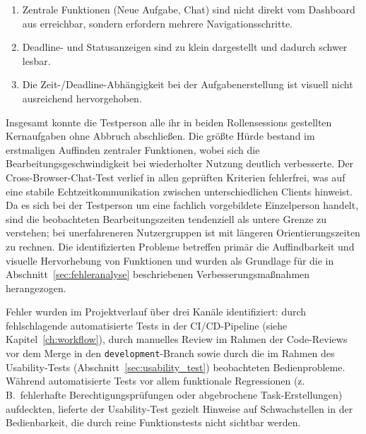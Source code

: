 \begin{enumerate}
    \item[\textbf{P1}] Zentrale Funktionen (\glqq{}Neue Aufgabe\grqq{}, Chat) sind nicht direkt vom Dashboard aus erreichbar, sondern erfordern mehrere Navigationsschritte.
    \item[\textbf{P2}] Deadline- und Statusanzeigen sind zu klein dargestellt und dadurch schwer lesbar.
    \item[\textbf{P3}] Die Zeit-/Deadline-Abhängigkeit bei der Aufgabenerstellung ist visuell nicht ausreichend hervorgehoben.
\end{enumerate}

Insgesamt konnte die Testperson alle ihr in beiden Rollensessions gestellten Kernaufgaben ohne Abbruch abschließen. Die größte Hürde bestand im erstmaligen Auffinden zentraler Funktionen, wobei sich die Bearbeitungsgeschwindigkeit bei wiederholter Nutzung deutlich verbesserte. Der Cross-Browser-Chat-Test verlief in allen geprüften Kriterien fehlerfrei, was auf eine stabile Echtzeitkommunikation zwischen unterschiedlichen Clients hinweist. Da es sich bei der Testperson um eine fachlich vorgebildete Einzelperson handelt, sind die beobachteten Bearbeitungszeiten tendenziell als untere Grenze zu verstehen; bei unerfahreneren Nutzergruppen ist mit längeren Orientierungszeiten zu rechnen. Die identifizierten Probleme betreffen primär die Auffindbarkeit und visuelle Hervorhebung von Funktionen und wurden als Grundlage für die in Abschnitt~\ref{sec:fehleranalyse} beschriebenen Verbesserungsmaßnahmen herangezogen.

\label{sec:fehleranalyse}

Fehler wurden im Projektverlauf über drei Kanäle identifiziert: durch fehlschlagende automatisierte Tests in der \gls{CI/CD}-Pipeline (siehe Kapitel~\ref{ch:workflow}), durch manuelles Review im Rahmen der Code-Reviews vor dem Merge in den \texttt{development}-Branch sowie durch die im Rahmen des Usability-Tests (Abschnitt~\ref{sec:usability_test}) beobachteten Bedienprobleme. Während automatisierte Tests vor allem funktionale Regressionen (z.\,B.\ fehlerhafte Berechtigungsprüfungen oder abgebrochene Task-Erstellungen) aufdeckten, lieferte der Usability-Test gezielt Hinweise auf Schwachstellen in der Bedienbarkeit, die durch reine Funktionstests nicht sichtbar werden.

